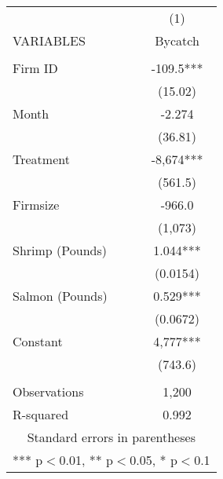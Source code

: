 \begin{tabular}{lc} \hline
 & (1) \\
VARIABLES & Bycatch \\ \hline
 &  \\
Firm ID & -109.5*** \\
 & (15.02) \\
Month & -2.274 \\
 & (36.81) \\
Treatment & -8,674*** \\
 & (561.5) \\
Firmsize & -966.0 \\
 & (1,073) \\
Shrimp (Pounds) & 1.044*** \\
 & (0.0154) \\
Salmon (Pounds) & 0.529*** \\
 & (0.0672) \\
Constant & 4,777*** \\
 & (743.6) \\
 &  \\
Observations & 1,200 \\
 R-squared & 0.992 \\ \hline
\multicolumn{2}{c}{ Standard errors in parentheses} \\
\multicolumn{2}{c}{ *** p$<$0.01, ** p$<$0.05, * p$<$0.1} \\
\end{tabular}
